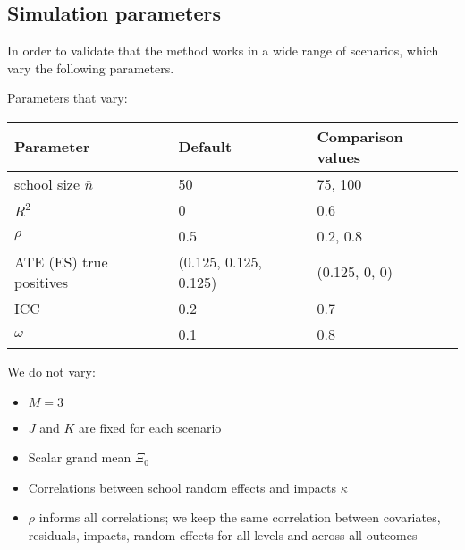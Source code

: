 \documentclass[
]{article}
\providecommand{\tightlist}{%
  \setlength{\itemsep}{0pt}\setlength{\parskip}{0pt}}
\begin{document}
\subsection{Simulation parameters}

In order to validate that the method works in a wide range of scenarios,
which vary the following parameters.

Parameters that vary:

\begin{longtable}[]{@{}lll@{}}
\toprule
Parameter & Default & Comparison values \\
\midrule
\endhead
school size \(\bar{n}\) & 50 & 75, 100 \\
\(R^2\) & 0 & 0.6 \\
\(\rho\) & 0.5 & 0.2, 0.8 \\
ATE (ES) true positives & (0.125, 0.125, 0.125) & (0.125, 0, 0) \\
ICC & 0.2 & 0.7 \\
\(\omega\) & 0.1 & 0.8 \\
\bottomrule
\end{longtable}

We do not vary:

\begin{itemize}
\tightlist
\item
  \(M = 3\)
\item
  \(J\) and \(K\) are fixed for each scenario
\item
  Scalar grand mean \(\Xi_0\)
\item
  Correlations between school random effects and impacts \(\kappa\)
\item
  \(\rho\) informs all correlations; we keep the same correlation
  between covariates, residuals, impacts, random effects for all levels
  and across all outcomes
\end{itemize}
\end{document}
